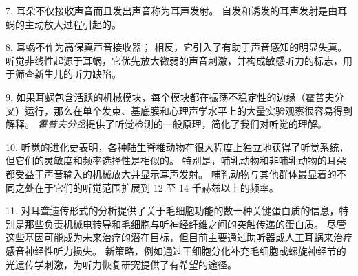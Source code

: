 7. 耳朵不仅接收声音而且发出声音称为耳声发射。
自发和诱发的耳声发射是由耳蜗的主动放大过程引起的。 


8. 耳蜗不作为高保真声音接收器；
相反，它引入了有助于声音感知的明显失真。
听觉非线性起源于耳蜗，它优先放大微弱的声音刺激，并构成敏感听力的标志，用于筛查新生儿的听力缺陷。


9. 如果耳蜗包含活跃的机械模块，每个模块都在振荡不稳定性的边缘（霍普夫分叉）运行，那么在单个发束、基底膜和心理声学水平上的大量实验观察很容易得到解释。
\textit{霍普夫分岔}提供了听觉检测的一般原理，简化了我们对听觉的理解。


10. 听觉的进化史表明，各种陆生脊椎动物在很大程度上独立地获得了听觉系统，但它们的灵敏度和频率选择性是相似的。
特别是，哺乳动物和非哺乳动物的耳朵都受益于声音输入的机械放大并显示耳声发射。
哺乳动物与其他群体最显着的不同之处在于它们的听觉范围扩展到 12 至 14 千赫兹以上的频率。


11. 对耳聋遗传形式的分析提供了关于毛细胞功能的数十种关键蛋白质的信息，特别是那些负责机械电转导和毛细胞与听神经纤维之间的突触传递的蛋白质。
尽管这些基因可能成为未来治疗的潜在目标，但目前主要通过助听器或人工耳蜗来治疗感音神经性听力损失。
新策略，例如通过干细胞分化补充毛细胞或螺旋神经节的光遗传学刺激，为听力恢复研究提供了有希望的途径。


